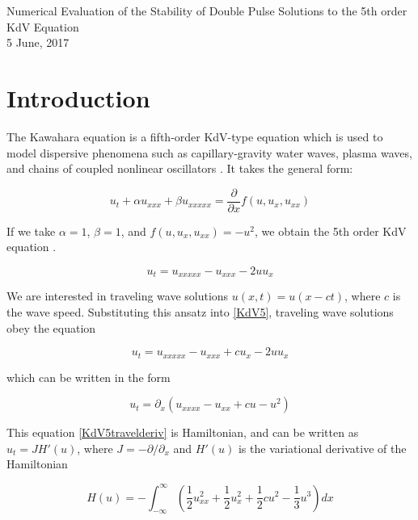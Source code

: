 \documentclass[12pt]{article}
\begin{document}
\begin{center}
{\LARGE Numerical Evaluation of the Stability of Double Pulse Solutions to the 5th order KdV Equation}\\
\vspace{5mm}
{\large 5 June, 2017}\\
\end{center}

\section{Introduction}

The Kawahara equation is a fifth-order KdV-type equation which is used to model dispersive phenomena such as capillary-gravity water waves, plasma waves, and chains of coupled nonlinear oscillators \cite{Bridges2002,Champneys1998}. It takes the general form:

\begin{equation} \label{kawahara}
u_t + \alpha u_{xxx} + \beta u_{xxxxx} = \frac{\partial}{\partial x} f(u, u_x, u_{xx})
\end{equation}

If we take $\alpha = 1$, $\beta = 1$, and $f(u, u_x, u_{xx}) = -u^2$, we obtain the 5th order KdV equation \cite{Pelinovsky2007}. 

\begin{equation} \label{KdV5}
u_t = u_{xxxxx} - u_{xxx} - 2 u u_x
\end{equation}

We are interested in traveling wave solutions $u(x, t) = u(x - ct)$, where $c$ is the wave speed. Substituting this ansatz into \eqref{KdV5}, traveling wave solutions obey the equation

\begin{equation} \label{KdV5travel}
u_t = u_{xxxxx} - u_{xxx} + c u_x - 2 u u_x
\end{equation}

which can be written in the form

\begin{equation} \label{KdV5travelderiv}
u_t = \partial_x ( u_{xxxx} - u_{xx} + c u - u^2 )
\end{equation}

This equation \eqref{KdV5travelderiv} is Hamiltonian, and can be written as $u_t = J H'(u)$, where $J = -\partial / \partial_x$ and $H'(u)$ is the variational derivative of the Hamiltonian

\begin{equation} \label{Hamiltonian}
H(u) = -\int_{-\infty}^{\infty} \left( \frac{1}{2}u_{xx}^2 + \frac{1}{2}u_x^2 + \frac{1}{2}cu^2 - \frac{1}{3}u^3 \right) dx
\end{equation}
\end{document}
